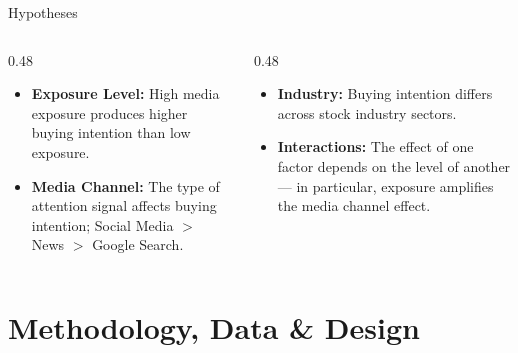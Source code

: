 \documentclass[aspectratio=169, 10pt]{beamer}
\begin{document}
\begin{frame}{Hypotheses}
  \begin{columns}[T]
    \begin{column}{0.48\textwidth}
      \begin{itemize}
        \setlength\itemsep{1.0em}
        \item[\textbf{H1}] \textbf{Exposure Level:} High media exposure produces \alert{higher} buying intention than low exposure.
        \item[\textbf{H2}] \textbf{Media Channel:} The type of attention signal affects buying intention; Social Media $>$ News $>$ Google Search.
      \end{itemize}
    \end{column}
    \begin{column}{0.48\textwidth}
      \begin{itemize}
        \setlength\itemsep{1.0em}
        \item[\textbf{H3}] \textbf{Industry:} Buying intention differs across stock industry sectors.
        \item[\textbf{H4}] \textbf{Interactions:} The effect of one factor depends on the level of another — in particular, exposure amplifies the media channel effect.
      \end{itemize}
    \end{column}
  \end{columns}
\end{frame}

\section{Methodology, Data \& Design}
\end{document}
